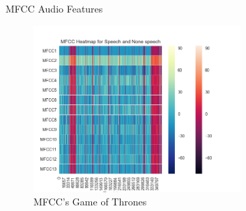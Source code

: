 \documentclass[notes]{beamer}
\begin{document}

\begin{frame}{MFCC Audio Features}

	\centering
	\begin{figure}
		\includegraphics[width=0.7\textwidth]{figures/mfcc_heatmap_speech_or_nospeech}
		\caption{MFCC's Game of Thrones}
	\end{figure}

\end{frame}

\end{document}
